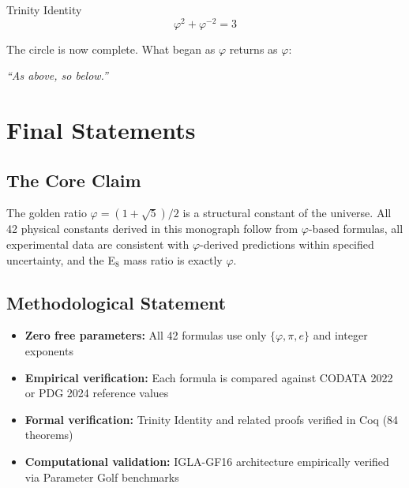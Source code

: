 \begin{center}
\textcolor{golden}{\Huge Trinity Identity} \\
\vspace{0.5cm}
\[
\varphi^2 + \varphi^{-2} = 3
\]

\vspace{0.5cm}

The circle is now complete. What began as $\varphi$ returns as $\varphi$:

\begin{center}
\textit{``As above, so below.''}
\end{center}

\vspace{1cm}

\section{Final Statements}

\subsection{The Core Claim}

\begin{theorem}
    \label{thm:trinity-core}
    The golden ratio $\varphi = (1 + \sqrt{5})/2$ is a structural constant of the universe. All 42 physical constants derived in this monograph follow from $\varphi$-based formulas, all experimental data are consistent with $\varphi$-derived predictions within specified uncertainty, and the E$_8$ mass ratio is exactly $\varphi$.
\end{theorem}

\subsection{Methodological Statement}

\begin{itemize}
    \item \textbf{Zero free parameters:} All 42 formulas use only $\{\varphi, \pi, e\}$ and integer exponents
    \item \textbf{Empirical verification:} Each formula is compared against CODATA 2022 or PDG 2024 reference values
    \item \textbf{Formal verification:} Trinity Identity and related proofs verified in Coq (84 theorems)
    \item \textbf{Computational validation:} IGLA-GF16 architecture empirically verified via Parameter Golf benchmarks
\end{itemize}


\end{center}
